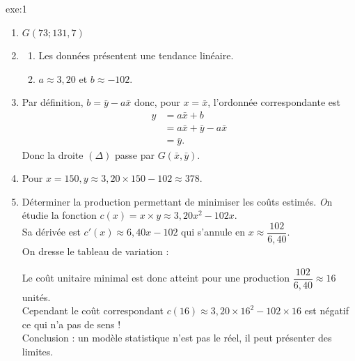 {}{exe:1}{
\begin{enumerate}
  \item $G(73 ; 131,7)$
  \item \begin{enumerate}
	 \item Les données présentent une tendance linéaire.
	 \item $a \approx 3,20$ et $b \approx -102$.
	\end{enumerate}
	\item Par définition, $b = \bar{y} - a \bar{x}$ donc, pour $x = \bar{x}$, l'ordonnée correspondante est 
	\begin{align*}
	y & = a \bar{x} + b \\
	& = a \bar{x} + \bar{y} - a \bar{x} \\
	& = \bar{y} .
	\end{align*}
	Donc la droite $(\Delta)$ passe par $G(\bar{x}, \bar{y})$.
	\item Pour $x = 150, y \approx 3,20 \times 150 - 102 \approx 378$.
	\item Déterminer la production permettant de minimiser les coûts estimés.
	\textit On étudie la fonction $c(x) = x \times y \approx 3,20 x^2 - 102 x$. \\
	 Sa dérivée est $c'(x) \approx 6,40 x -102$ qui s'annule en $x \approx \dfrac{102}{6,40}$. \\
	 On dresse le tableau de variation :
	 \begin{center}
	\end{center}	
	Le coût unitaire minimal est donc atteint pour une production $\dfrac{102}{6,40} \approx 16$ unités. \\
	Cependant le coût correspondant $c(16) \approx 3,20 \times 16^2 - 102 \times 16$ est négatif ce qui n'a pas de sens ! \\
	Conclusion : un modèle statistique n'est pas le réel, il peut présenter des limites.
\end{enumerate}
}

\newpage

